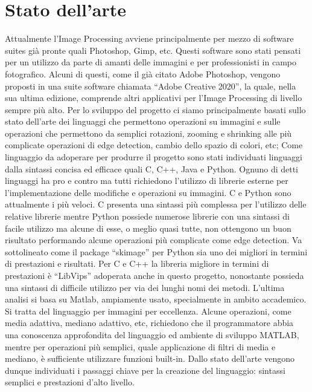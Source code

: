 \documentclass[10pt]{article}
\begin{document}
\section{Stato dell'arte}Attualmente l’Image Processing avviene principalmente per mezzo di software suites già pronte quali Photoshop, Gimp, etc. Questi software sono stati pensati per un utilizzo da parte di amanti delle immagini e per professionisti in campo fotografico. Alcuni di questi, come il già citato Adobe Photoshop, vengono proposti in una suite software chiamata “Adobe Creative 2020”, la quale, nella sua ultima edizione, comprende altri applicativi per l’Image Processing di livello sempre più alto.
Per lo sviluppo del progetto ci siamo principalmente basati sullo stato dell’arte dei linguaggi che permettono operazioni su immagini e sulle operazioni che permettono da semplici  rotazioni, zooming e shrinking alle più complicate operazioni di edge detection, cambio dello spazio di colori, etc;\newline
Come linguaggio da adoperare per produrre il progetto sono stati individuati linguaggi dalla sintassi concisa ed efficace quali C, C++, Java e Python. Ognuno di detti linguaggi ha pro e contro ma tutti richiedono l’utilizzo di librerie esterne per l’implementazione delle modifiche e operazioni su immagini. C e Python sono attualmente i più veloci. C presenta una sintassi più complessa per l’utilizzo delle relative librerie mentre Python possiede numerose librerie con una sintassi di facile utilizzo ma alcune di esse, o meglio quasi tutte, non ottengono un buon risultato performando alcune operazioni più complicate come edge detection. Va sottolineato come il package “skimage” per Python sia uno dei migliori in termini di prestazioni e risultati. Per C e C++ la libreria migliore in termini di prestazioni è “LibVips” adoperata anche in questo progetto, nonostante possieda una sintassi di difficile utilizzo per via dei lunghi nomi dei metodi. L’ultima analisi si basa su Matlab, ampiamente usato, specialmente in ambito accademico. Si tratta del linguaggio per immagini per eccellenza. Alcune operazioni, come media adattiva, mediano adattivo, etc, richiedono che il programmatore abbia una conoscenza approfondita del linguaggio ed ambiente di sviluppo MATLAB, mentre per operazioni più semplici, quale applicazione di filtri di media e mediano, è sufficiente utilizzare funzioni built-in.
Dallo stato dell’arte vengono dunque individuati i passaggi chiave per la creazione del linguaggio: sintassi semplici e prestazioni d’alto livello.
\clearpage
\end{document}
